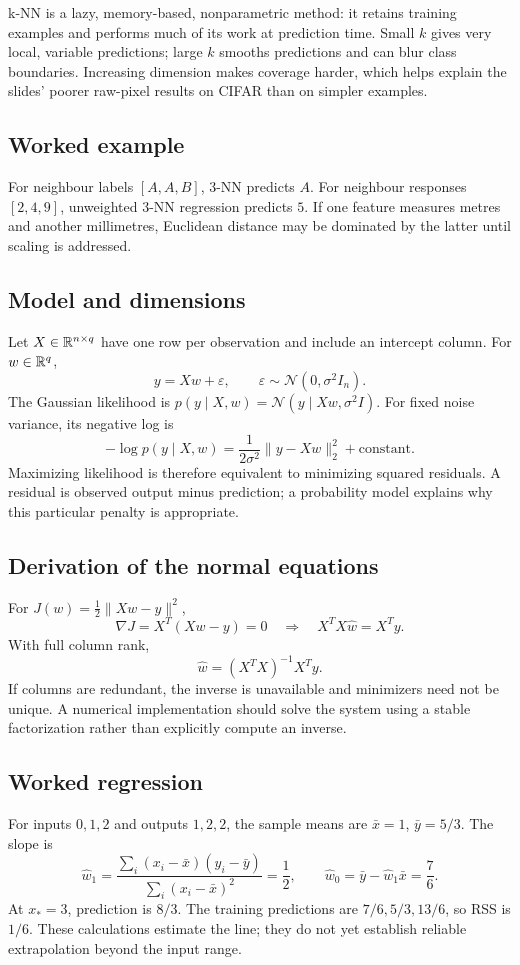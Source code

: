\documentclass[11pt]{article}
\begin{document}
k-NN is a lazy, memory-based, nonparametric method: it retains training examples and performs much of its work at prediction time. Small $k$ gives very local, variable predictions; large $k$ smooths predictions and can blur class boundaries. Increasing dimension makes coverage harder, which helps explain the slides' poorer raw-pixel results on CIFAR than on simpler examples.
\subsection{Worked example}
For neighbour labels $[A,A,B]$, 3-NN predicts $A$. For neighbour responses $[2,4,9]$, unweighted 3-NN regression predicts $5$. If one feature measures metres and another millimetres, Euclidean distance may be dominated by the latter until scaling is addressed.
\subsection{Model and dimensions}
Let $X\in\mathbb{R}^{n\times q}$ have one row per observation and include an intercept column. For $w\in\mathbb{R}^q$,
\[
y=Xw+\varepsilon,\qquad \varepsilon\sim\mathcal N(0,\sigma^2I_n).
\]
The Gaussian likelihood is $p(y\mid X,w)=\mathcal N(y\mid Xw,\sigma^2I)$. For fixed noise variance, its negative log is
\[
-\log p(y\mid X,w)=\frac{1}{2\sigma^2}\|y-Xw\|_2^2+\text{constant}.
\]
Maximizing likelihood is therefore equivalent to minimizing squared residuals. A residual is observed output minus prediction; a probability model explains why this particular penalty is appropriate.
\subsection{Derivation of the normal equations}
For $J(w)=\tfrac12\|Xw-y\|^2$,
\[
\nabla J=X^T(Xw-y)=0\quad\Longrightarrow\quad X^TX\hat w=X^Ty.
\]
With full column rank,
\[
\hat w=(X^TX)^{-1}X^Ty.
\]
If columns are redundant, the inverse is unavailable and minimizers need not be unique. A numerical implementation should solve the system using a stable factorization rather than explicitly compute an inverse.
\subsection{Worked regression}
For inputs $0,1,2$ and outputs $1,2,2$, the sample means are $\bar x=1$, $\bar y=5/3$. The slope is
\[
\hat w_1=\frac{\sum_i(x_i-\bar x)(y_i-\bar y)}{\sum_i(x_i-\bar x)^2}
=\frac1{2},\qquad \hat w_0=\bar y-\hat w_1\bar x=\frac76.
\]
At $x_*=3$, prediction is $8/3$. The training predictions are $7/6,5/3,13/6$, so RSS is $1/6$. These calculations estimate the line; they do not yet establish reliable extrapolation beyond the input range.
\end{document}
